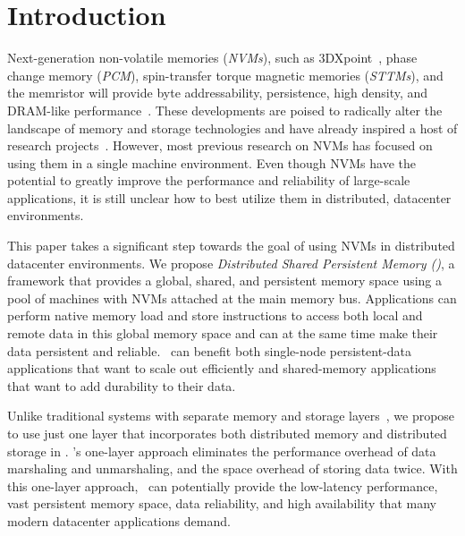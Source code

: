 \section{Introduction}
\label{sec:hotpot:introduction}

Next-generation non-volatile memories ({\em NVMs}), 
such as 3DXpoint~\cite{Intel3DXpoint}, 
phase change memory ({\em PCM}),
spin-transfer torque magnetic memories ({\em STTMs}),  and the memristor
will provide byte addressability, persistence, high density, and DRAM-like performance~\cite{NVMDB}.
These developments are poised to radically alter the landscape of memory and storage technologies
and have already inspired a host of research 
projects~\cite{Bailey10-OSImpl,Coburn11-ASPLOS, sosp09:bpfs, Dulloor14-EuroSys, hotos09:mogul, Volos11-ASPLOS, Xiaojian11-SC,Zhang15-Mojim,Octopus}.
However, most previous research on NVMs has focused on using them in a single machine environment.
Even though NVMs have the potential to greatly improve the performance and reliability of large-scale applications,
it is still unclear how to best utilize them in distributed, datacenter environments. 

This paper takes a significant step towards the goal of using NVMs in distributed datacenter environments.
We propose {\em Distributed Shared Persistent Memory (\dsnvm)},
a framework that provides a global, shared, and persistent memory space 
using a pool of machines with NVMs attached at the main memory bus.
Applications can perform native memory load and store instructions to access both local and remote data in this global memory space 
and can at the same time make their data persistent and reliable.
\dsnvm\ can benefit both single-node persistent-data applications that want to scale out efficiently
and shared-memory applications that want to add durability to their data.

Unlike traditional systems with separate memory and storage layers~\cite{Larchant,Perdis00,Larchant94,PerDis},
we propose to use just one layer that incorporates both distributed memory and 
distributed storage in \dsnvm.
\dsnvm's one-layer approach eliminates the performance overhead of data marshaling and unmarshaling,
and the space overhead of storing data twice. 
With this one-layer approach, \dsnvm\ can potentially provide the low-latency performance, 
vast persistent memory space, data reliability, and high availability
that many modern datacenter applications demand. 


